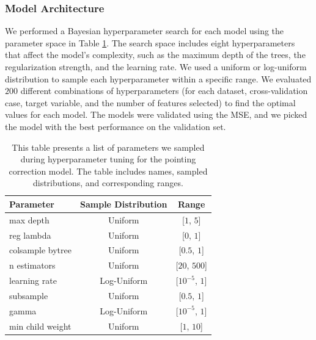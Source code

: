 \subsubsection{Model Architecture}
We performed a Bayesian hyperparameter search for each model using the parameter space in Table \ref{tab:xgb_hyperparameters_pcorr}.
The search space includes eight hyperparameters that affect the model's complexity, such as the maximum depth of the trees, the regularization strength, and the learning rate.
We used a uniform or log-uniform distribution to sample each hyperparameter within a specific range.
We evaluated $200$ different combinations of hyperparameters (for each dataset, cross-validation case, target variable, and the number of features selected) to find the optimal values for each model.
The models were validated using the MSE, and we picked the model with the best performance on the validation set.


\begin{table}[H]
    \centering
    \caption{This table presents a list of parameters we sampled during hyperparameter tuning for the pointing correction model. The table includes names, sampled distributions, and corresponding ranges.}
    \begin{tabular}{lcc}
        \toprule
        \textbf{Parameter} & \textbf{Sample Distribution} & \textbf{Range} \\ \hline
        max depth & Uniform & [$1$, $5$] \\ 
        reg lambda & Uniform & [$0$, $1$] \\ 
        colsample bytree & Uniform & [$0.5$, $1$] \\ 
        n estimators & Uniform & [$20$, $500$] \\ 
        learning rate & Log-Uniform & [$10^{-5}$, $1$] \\ 
        subsample & Uniform & [$0.5$, $1$] \\ 
        gamma & Log-Uniform & [$10^{-5}$, $1$] \\ 
        min child weight & Uniform & [$1$, $10$] \\ 
        \bottomrule
    \end{tabular}
    \label{tab:xgb_hyperparameters_pcorr}
\end{table}



